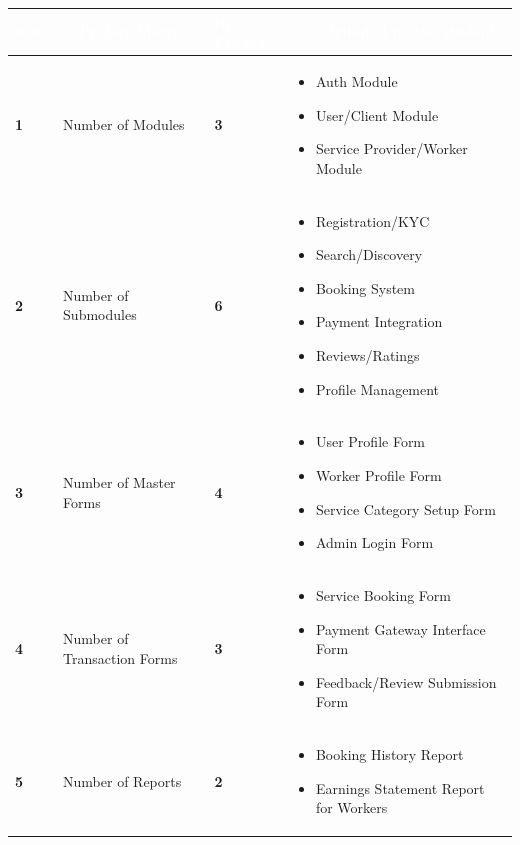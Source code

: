 \documentclass[12pt,a4paper]{article}
\begin{document}
\begin{table}[h!]
\centering
\renewcommand{\arraystretch}{1.5}
\begin{tabular}{|>{\centering\arraybackslash}p{1cm}|p{4.5cm}|>{\centering\arraybackslash}p{1.5cm}|p{7.5cm}|}
\hline
\rowcolor{headerblue}
\textcolor{white}{\textbf{S.No}} & 
\multicolumn{1}{c|}{\textcolor{white}{\textbf{Project Metric}}} & 
\textcolor{white}{\textbf{In Project}} & 
\multicolumn{1}{c|}{\textcolor{white}{\textbf{Contributed by the student}}} \\
\hline
\rowcolor{lightgray}
\textbf{1} & Number of Modules & \textbf{3} & 
\begin{itemize}[nosep, leftmargin=*, topsep=0pt]
    \item Auth Module
    \item User/Client Module
    \item Service Provider/Worker Module
\end{itemize} \\
\hline

\textbf{2} & Number of Submodules & \textbf{6} & 
\begin{itemize}[nosep, leftmargin=*, topsep=0pt]
    \item Registration/KYC
    \item Search/Discovery
    \item Booking System
    \item Payment Integration
    \item Reviews/Ratings
    \item Profile Management
\end{itemize} \\
\hline
\rowcolor{lightgray}
\textbf{3} & Number of Master Forms & \textbf{4} & 
\begin{itemize}[nosep, leftmargin=*, topsep=0pt]
    \item User Profile Form
    \item Worker Profile Form
    \item Service Category Setup Form
    \item Admin Login Form
\end{itemize} \\
\hline

\textbf{4} & Number of Transaction Forms & \textbf{3} & 
\begin{itemize}[nosep, leftmargin=*, topsep=0pt]
    \item Service Booking Form
    \item Payment Gateway Interface Form
    \item Feedback/Review Submission Form
\end{itemize} \\
\hline
\rowcolor{lightgray}
\textbf{5} & Number of Reports & \textbf{2} & 
\begin{itemize}[nosep, leftmargin=*, topsep=0pt]
    \item Booking History Report
    \item Earnings Statement Report for Workers
\end{itemize} \\
\hline


\end{tabular}
\end{table}
\end{document}
